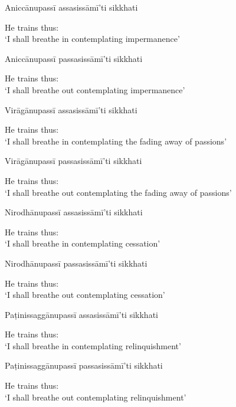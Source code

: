 Aniccānupassī assasissāmī'ti sikkhati

\begin{english}
  He trains thus:\\
  `I shall breathe in contemplating impermanence'
\end{english}

Aniccānupassī passasissāmī'ti sikkhati

\begin{english}
  He trains thus:\\
  `I shall breathe out contemplating impermanence'
\end{english}

Virāgānupassī assasissāmī'ti sikkhati

\begin{english}
  He trains thus:\\
  `I shall breathe in contemplating the fading away of passions'
\end{english}

Virāgānupassī passasissāmī'ti sikkhati

\begin{english}
  He trains thus:\\
  `I shall breathe out contemplating the fading away of passions'
\end{english}

Nirodhānupassī assasissāmī'ti sikkhati

\begin{english}
  He trains thus:\\
  `I shall breathe in contemplating cessation'
\end{english}

Nirodhānupassī passasissāmī'ti sikkhati

\begin{english}
  He trains thus:\\
  `I shall breathe out contemplating cessation'
\end{english}

Paṭinissaggānupassī assasissāmī'ti sikkhati

\begin{english}
  He trains thus:\\
  `I shall breathe in contemplating relinquishment'
\end{english}

Paṭinissaggānupassī passasissāmī'ti sikkhati

\begin{english}
  He trains thus:\\
  `I shall breathe out contemplating relinquishment'
\end{english}

